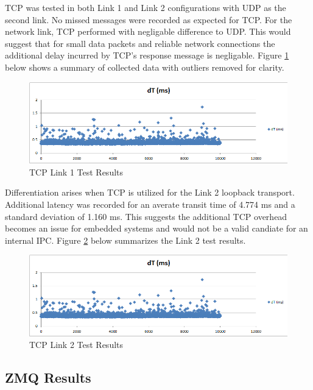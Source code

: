 TCP was tested in both Link 1 and Link 2 configurations with UDP as the second link. No missed messages were recorded as expected for TCP. For the network link, TCP performed with negligable difference to UDP. This would suggest that for small data packets and reliable network connections the additional delay incurred by TCP's response message is negligable. Figure \ref{fig:TCP L1 results} below shows a summary of collected data with outliers removed for clarity.

\begin{figure}[thpb]
 \centering
 \includegraphics[width=1.0\columnwidth]{./images/tcp2udp.png}
  \caption{TCP Link 1 Test Results}  
  \label{fig:TCP L1 results}
\end{figure} 

Differentiation arises when TCP is utilized for the Link 2 loopback transport. Additional latency was recorded for an averate transit time of 4.774 ms and a standard deviation of  1.160 ms. This suggests the additional TCP overhead becomes an issue for embedded systems and would not be a valid candiate for an internal IPC. Figure \ref{fig:TCP L2 results} below summarizes the Link 2 test results.

\begin{figure}[thpb]
 \centering
 \includegraphics[width=1.0\columnwidth]{./images/tcp2udp.png}
  \caption{TCP Link 2 Test Results}  
  \label{fig:TCP L2 results}
\end{figure} 

\subsection{ZMQ Results}

